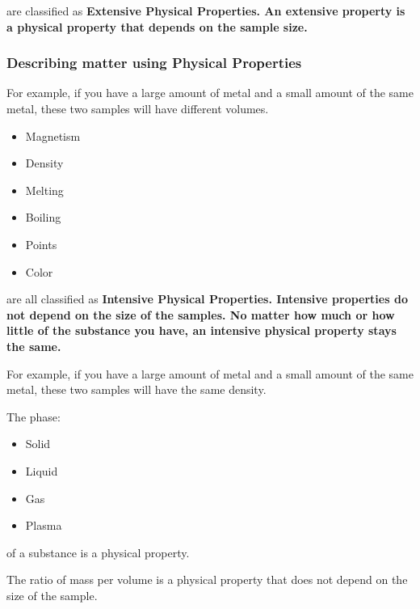 are classified as \bf{Extensive Physical Properties}. An extensive property
is a physical property that depends on the sample size.

\subsubsection*{Describing matter using Physical Properties}

\begin{example}
    For example, if you have a large amount of metal and a small amount of the same
    metal, these two samples will have different volumes.
\end{example}

\begin{itemize}
    \item Magnetism
    \item Density
    \item Melting
    \item Boiling
    \item Points
    \item Color
\end{itemize}

are all classified as \bf{Intensive Physical Properties}. Intensive
properties do not depend on the size of the samples. No matter how much or how
little of the substance you have, an intensive physical property stays the
same.

\begin{example}
    For example, if you have a large amount of metal and a small amount of
    the same metal, these two samples will have the same density.
\end{example}

\begin{definition}
    The phase:
    
    \begin{itemize}
        \item Solid
        \item Liquid
        \item Gas
        \item Plasma
    \end{itemize}
    
    of a substance is a physical property.
\end{definition}

\begin{definition}[Density]
    The ratio of mass per volume is a physical property that does not depend on
    the size of the sample.
\end{definition}

